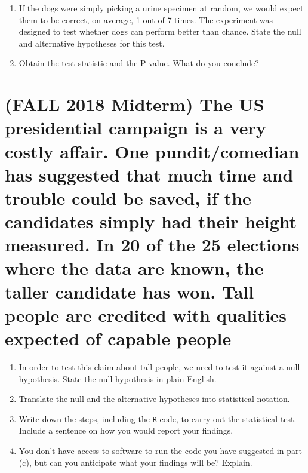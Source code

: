 \documentclass[letterpaper,11pt,twoside,]{pinp}
\providecommand{\tightlist}{%
  \setlength{\itemsep}{0pt}\setlength{\parskip}{0pt}}
\begin{document}
\begin{enumerate}
\def\labelenumi{\alph{enumi}.}
\tightlist
\item
  If the dogs were simply picking a urine specimen at random, we would
  expect them to be correct, on average, 1 out of 7 times. The
  experiment was designed to test whether dogs can perform better than
  chance. State the null and alternative hypotheses for this test.
\item
  Obtain the test statistic and the P-value. What do you conclude?
\end{enumerate}

\hypertarget{fall-2018-midterm-the-us-presidential-campaign-is-a-very-costly-affair.-one-punditcomedian-has-suggested-that-much-time-and-trouble-could-be-saved-if-the-candidates-simply-had-their-height-measured.-in-20-of-the-25-elections-where-the-data-are-known-the-taller-candidate-has-won.-tall-people-are-credited-with-qualities-expected-of-capable-people}{%
\section{(FALL 2018 Midterm) The US presidential campaign is a very
costly affair. One pundit/comedian has suggested that much time and
trouble could be saved, if the candidates simply had their height
measured. In 20 of the 25 elections where the data are known, the taller
candidate has won. Tall people are credited with qualities expected of
capable
people}\label{fall-2018-midterm-the-us-presidential-campaign-is-a-very-costly-affair.-one-punditcomedian-has-suggested-that-much-time-and-trouble-could-be-saved-if-the-candidates-simply-had-their-height-measured.-in-20-of-the-25-elections-where-the-data-are-known-the-taller-candidate-has-won.-tall-people-are-credited-with-qualities-expected-of-capable-people}}

\begin{enumerate}
\def\labelenumi{\alph{enumi}.}
\tightlist
\item
  In order to test this claim about tall people, we need to test it
  against a null hypothesis. State the null hypothesis in plain English.
\item
  Translate the null and the alternative hypotheses into statistical
  notation.
\item
  Write down the steps, including the \texttt{R} code, to carry out the
  statistical test. Include a sentence on how you would report your
  findings.
\item
  You don't have access to software to run the code you have suggested
  in part (c), but can you anticipate what your findings will be?
  Explain.
\end{enumerate}





\end{document}
